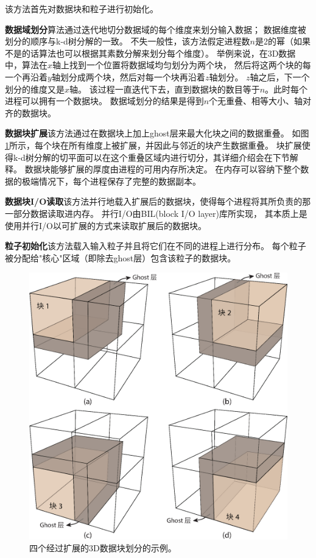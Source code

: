 该方法首先对数据块和粒子进行初始化。

{\bf 数据域划分}\quad 算法通过迭代地切分数据域的每个维度来划分输入数据；
数据维度被划分的顺序与k-d树分解的一致。
不失一般性，该方法假定进程数$n$是2的幂（如果不是的话算法也可以根据其素数分解来划分每个维度）。
举例来说，在3D数据中，算法在$x$轴上找到一个位置将数据域均匀划分为两个块，
然后将这两个块的每一个再沿着$y$轴划分成两个块，然后对每一个块再沿着$z$轴划分。
$z$轴之后，下一个划分的维度又是$x$轴。
该过程一直迭代下去，直到数据块的数目等于$n$。此时每个进程可以拥有一个数据块。 数据域划分的结果是得到$n$个无重叠、相等大小、轴对齐的数据块。

{\bf 数据块扩展}\quad 该方法通过在数据块上加上ghost层来最大化块之间的数据重叠。
如图\ref{fig:kdtree:ghost}所示，每个块在所有维度上被扩展，并因此与邻近的块产生数据重叠。
块扩展使得k-d树分解的切平面可以在这个重叠区域内进行切分，其详细介绍会在下节解释。
数据块能够扩展的厚度由进程的可用内存所决定。
在内存可以容纳下整个数据的极端情况下，每个进程保存了完整的数据副本。

{\bf 数据块I/O读取}\quad 该方法并行地载入扩展后的数据块，使得每个进程将其所负责的那一部分数据读取进内存。
并行I/O由BIL(block I/O layer)\parencite{KendallHPLR11}库所实现，
其本质上是使用并行I/O以可扩展的方式来读取扩展后的数据块。

{\bf 粒子初始化}\quad 该方法载入输入粒子并且将它们在不同的进程上进行分布。
每个粒子被分配给"核心"区域（即除去ghost层）包含该粒子的数据块。
\begin{figure}[!tb]
  \centering
  \includegraphics[width=0.6\linewidth]{image/loadbalance/ghost}
  \caption{四个经过扩展的3D数据块划分的示例。\parencite{ZhangGHYP18}}
  \label{fig:kdtree:ghost}
\end{figure}


